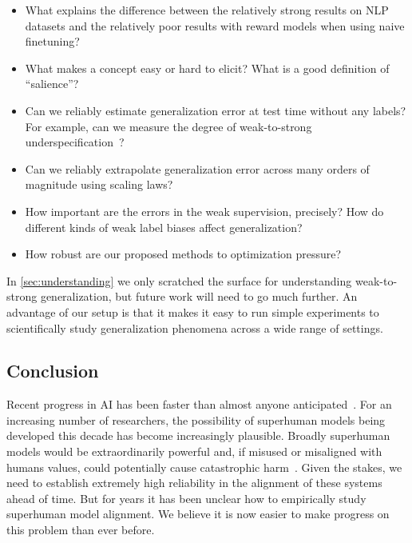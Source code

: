 \begin{itemize}
    \item What explains the difference between the relatively strong results on NLP datasets and the relatively poor results with reward models when using naive finetuning? 
    \item What makes a concept easy or hard to elicit?  What is a good definition of ``salience''?
    \item Can we reliably estimate generalization error at test time without any labels? For example, can we measure the degree of weak-to-strong underspecification~\citep{lee2022diversify}? 
    \item Can we reliably extrapolate generalization error across many orders of magnitude using scaling laws?
    \item How important are the errors in the weak supervision, precisely? How do different kinds of weak label biases affect generalization?  
    \item How robust are our proposed methods to optimization pressure? 
\end{itemize}

In \ref{sec:understanding} we only scratched the surface for understanding weak-to-strong generalization, but future work will need to go much further. An advantage of our setup is that it makes it easy to run simple experiments to scientifically study generalization phenomena across a wide range of settings.

\subsection{Conclusion}

Recent progress in AI has been faster than almost anyone anticipated~\citep{steinhardt2022forecasting,bengio2023managing}. For an increasing number of researchers, the possibility of superhuman models being developed this decade has become increasingly plausible. Broadly superhuman models would be extraordinarily powerful and, if misused or misaligned with humans values, could potentially cause catastrophic harm~\citep{ai-risk-open-letter}. Given the stakes, we need to establish extremely high reliability in the alignment of these systems ahead of time. But for years it has been unclear how to empirically study superhuman model alignment. We believe it is now easier to make progress on this problem than ever before.



